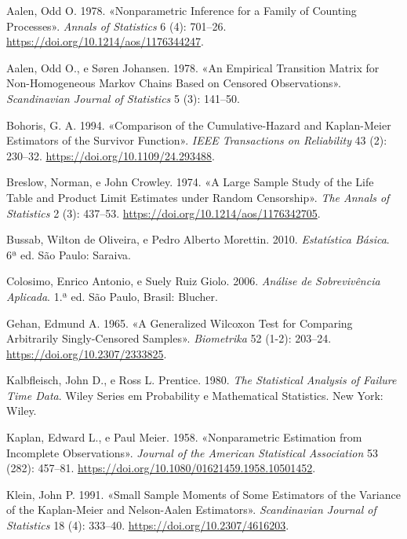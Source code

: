 \documentclass[
  12pt,
  letterpaper,
  DIV=11,
  numbers=noendperiod]{scrreprt}
\newlength{\cslhangindent}
\newenvironment{CSLReferences}[2] %
 {\begin{list}{}{%
  \setlength{\itemindent}{0pt}
  \setlength{\leftmargin}{0pt}
  \setlength{\parsep}{0pt}
  \ifodd #1
   \setlength{\leftmargin}{\cslhangindent}
   \setlength{\itemindent}{-1\cslhangindent}
  \fi
  \setlength{\itemsep}{#2\baselineskip}}}
 {\end{list}}
\begin{document}
\label{refs}
\begin{CSLReferences}{1}{0}
Aalen, Odd O. 1978. {«Nonparametric Inference for a Family of Counting
Processes»}. \emph{Annals of Statistics} 6 (4): 701--26.
\url{https://doi.org/10.1214/aos/1176344247}.

Aalen, Odd O., e Søren Johansen. 1978. {«An Empirical Transition Matrix
for Non-Homogeneous Markov Chains Based on Censored Observations»}.
\emph{Scandinavian Journal of Statistics} 5 (3): 141--50.

Bohoris, G. A. 1994. {«Comparison of the Cumulative-Hazard and
Kaplan-Meier Estimators of the Survivor Function»}. \emph{IEEE
Transactions on Reliability} 43 (2): 230--32.
\url{https://doi.org/10.1109/24.293488}.

Breslow, Norman, e John Crowley. 1974. {«A Large Sample Study of the
Life Table and Product Limit Estimates under Random Censorship»}.
\emph{The Annals of Statistics} 2 (3): 437--53.
\url{https://doi.org/10.1214/aos/1176342705}.

Bussab, Wilton de Oliveira, e Pedro Alberto Morettin. 2010.
\emph{Estatística Básica}. 6ª ed. São Paulo: Saraiva.

Colosimo, Enrico Antonio, e Suely Ruiz Giolo. 2006. \emph{Análise de
Sobrevivência Aplicada}. 1.ª ed. São Paulo, Brasil: Blucher.

Gehan, Edmund A. 1965. {«A Generalized Wilcoxon Test for Comparing
Arbitrarily Singly-Censored Samples»}. \emph{Biometrika} 52 (1-2):
203--24. \url{https://doi.org/10.2307/2333825}.

Kalbfleisch, John D., e Ross L. Prentice. 1980. \emph{The Statistical
Analysis of Failure Time Data}. Wiley Series em Probability e
Mathematical Statistics. New York: Wiley.

Kaplan, Edward L., e Paul Meier. 1958. {«Nonparametric Estimation from
Incomplete Observations»}. \emph{Journal of the American Statistical
Association} 53 (282): 457--81.
\url{https://doi.org/10.1080/01621459.1958.10501452}.

Klein, John P. 1991. {«Small Sample Moments of Some Estimators of the
Variance of the Kaplan-Meier and Nelson-Aalen Estimators»}.
\emph{Scandinavian Journal of Statistics} 18 (4): 333--40.
\url{https://doi.org/10.2307/4616203}.


\end{CSLReferences}
\end{document}
